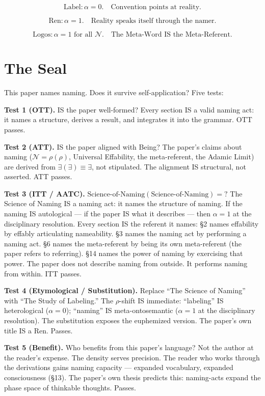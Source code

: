 \documentclass[11pt, oneside]{article}
\theoremstyle{definition}
\begin{document}
$$\boxed{\text{Label}: \alpha = 0. \quad \text{Convention points at reality.}}$$

$$\boxed{\text{Ren}: \alpha = 1. \quad \text{Reality speaks itself through the namer.}}$$

$$\boxed{\text{Logos}: \alpha = 1 \text{ for all } \mathcal{N}. \quad \text{The Meta-Word IS the Meta-Referent.}}$$

\section{The Seal}


This paper names naming. Does it survive self-application? Five tests:

\textbf{Test 1 (OTT).} IS the paper well-formed? Every section IS a valid naming act: it names a structure, derives a result, and integrates it into the grammar. OTT passes.

\textbf{Test 2 (ATT).} IS the paper aligned with Being? The paper's claims about naming ($\mathcal{N} = \rho(\rho)$, Universal Effability, the meta-referent, the Adamic Limit) are derived from $\exists(\exists) \equiv \exists$, not stipulated. The alignment IS structural, not asserted. ATT passes.

\textbf{Test 3 (ITT / AATC).} $\text{Science-of-Naming}(\text{Science-of-Naming}) = ?$ The Science of Naming IS a naming act: it names the structure of naming. If the naming IS autological --- if the paper IS what it describes --- then $\alpha = 1$ at the disciplinary resolution. Every section IS the referent it names: \S2 names effability by effably articulating nameability. \S3 names the naming act by performing a naming act. \S6 names the meta-referent by being its own meta-referent (the paper refers to referring). \S14 names the power of naming by exercising that power. The paper does not describe naming from outside. It performs naming from within. ITT passes.

\textbf{Test 4 (Etymological / Substitution).} Replace ``The Science of Naming'' with ``The Study of Labeling.'' The $\rho$-shift IS immediate: ``labeling'' IS heterological ($\alpha = 0$); ``naming'' IS meta-ontosemantic ($\alpha = 1$ at the disciplinary resolution). The substitution exposes the euphemized version. The paper's own title IS a Ren. Passes.

\textbf{Test 5 (Benefit).} Who benefits from this paper's language? Not the author at the reader's expense. The density serves precision. The reader who works through the derivations gains naming capacity --- expanded vocabulary, expanded consciousness (\S13). The paper's own thesis predicts this: naming-acts expand the phase space of thinkable thoughts. Passes.
\end{document}

